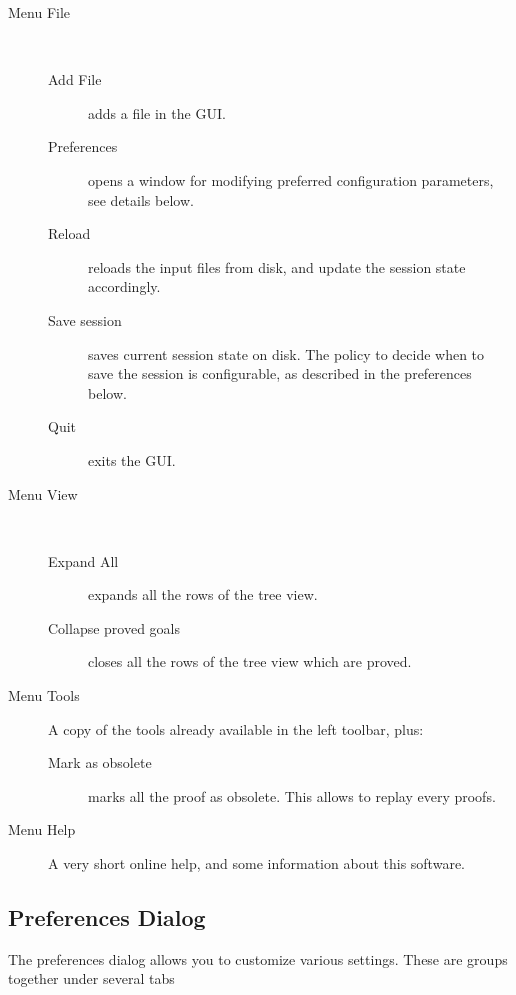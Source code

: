 \begin{description}
\item[Menu \textsf{File}]~
\begin{description}
\item[Add File] adds a file in the GUI.
\item[Preferences] opens a window for modifying preferred
  configuration parameters, see details below.
\item[Reload] reloads the input files from disk, and update the session state accordingly.
\item[Save session] saves current session state on disk. The policy to decide when to save the session is configurable, as described in the preferences below.
\item[Quit] exits the GUI.
\end{description}

\item[Menu \textsf{View}]~
\begin{description}
\item[Expand All] expands all the rows of the tree view.
\item[Collapse proved goals] closes all the rows of the tree view
  which are proved.
\end{description}

\item[Menu \textsf{Tools}]
A copy of the tools already available in the left toolbar, plus:
\begin{description}
\item[Mark as obsolete] marks all the proof as obsolete. This allows to
  replay every proofs.
\end{description}

\item[Menu \textsf{Help}]
A very short online help, and some information about this software.
\end{description}

\subsection{Preferences Dialog}

The preferences dialog allows you to customize various settings. These
are groups together under several tabs

